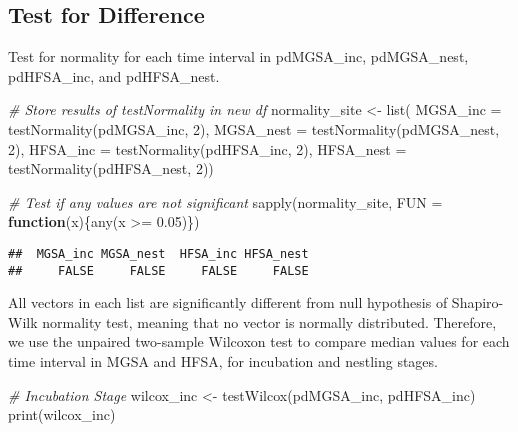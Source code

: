 \documentclass[
]{article}
\newenvironment{Shaded}{\begin{snugshade}}{\end{snugshade}}
\newcommand{\AttributeTok}[1]{\textcolor[rgb]{0.77,0.63,0.00}{#1}}
\newcommand{\CommentTok}[1]{\textcolor[rgb]{0.56,0.35,0.01}{\textit{#1}}}
\newcommand{\ControlFlowTok}[1]{\textcolor[rgb]{0.13,0.29,0.53}{\textbf{#1}}}
\newcommand{\DecValTok}[1]{\textcolor[rgb]{0.00,0.00,0.81}{#1}}
\newcommand{\FloatTok}[1]{\textcolor[rgb]{0.00,0.00,0.81}{#1}}
\newcommand{\FunctionTok}[1]{\textcolor[rgb]{0.00,0.00,0.00}{#1}}
\newcommand{\NormalTok}[1]{#1}
\newcommand{\OtherTok}[1]{\textcolor[rgb]{0.56,0.35,0.01}{#1}}
\newcommand{\SpecialCharTok}[1]{\textcolor[rgb]{0.00,0.00,0.00}{#1}}
\begin{document}
\hypertarget{test-for-difference-1}{%
\subsection{Test for Difference}\label{test-for-difference-1}}

Test for normality for each time interval in pdMGSA\_inc, pdMGSA\_nest,
pdHFSA\_inc, and pdHFSA\_nest.

\begin{Shaded}
\begin{Highlighting}[]
\CommentTok{\# Store results of testNormality in new df}
\NormalTok{normality\_site }\OtherTok{\textless{}{-}} \FunctionTok{list}\NormalTok{(}
  \AttributeTok{MGSA\_inc =} \FunctionTok{testNormality}\NormalTok{(pdMGSA\_inc, }\DecValTok{2}\NormalTok{), }
  \AttributeTok{MGSA\_nest =} \FunctionTok{testNormality}\NormalTok{(pdMGSA\_nest, }\DecValTok{2}\NormalTok{), }
  \AttributeTok{HFSA\_inc =} \FunctionTok{testNormality}\NormalTok{(pdHFSA\_inc, }\DecValTok{2}\NormalTok{),}
  \AttributeTok{HFSA\_nest =} \FunctionTok{testNormality}\NormalTok{(pdHFSA\_nest, }\DecValTok{2}\NormalTok{))}

\CommentTok{\# Test if any values are not significant}
\FunctionTok{sapply}\NormalTok{(normality\_site, }\AttributeTok{FUN =} \ControlFlowTok{function}\NormalTok{(x)\{}\FunctionTok{any}\NormalTok{(x }\SpecialCharTok{\textgreater{}=} \FloatTok{0.05}\NormalTok{)\})}
\end{Highlighting}
\end{Shaded}

\begin{verbatim}
##  MGSA_inc MGSA_nest  HFSA_inc HFSA_nest 
##     FALSE     FALSE     FALSE     FALSE
\end{verbatim}

All vectors in each list are significantly different from null
hypothesis of Shapiro-Wilk normality test, meaning that no vector is
normally distributed. Therefore, we use the unpaired two-sample Wilcoxon
test to compare median values for each time interval in MGSA and HFSA,
for incubation and nestling stages.

\begin{Shaded}
\begin{Highlighting}[]
\CommentTok{\# Incubation Stage}
\NormalTok{wilcox\_inc }\OtherTok{\textless{}{-}} \FunctionTok{testWilcox}\NormalTok{(pdMGSA\_inc, pdHFSA\_inc)}
\FunctionTok{print}\NormalTok{(wilcox\_inc)}
\end{Highlighting}
\end{Shaded}
\end{document}
